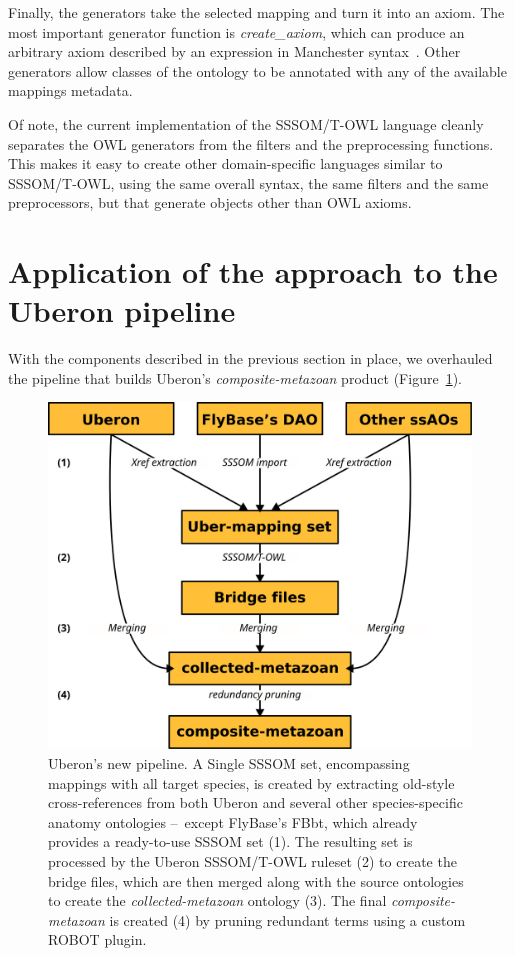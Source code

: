 \documentclass{ceurart}
\def\function#1{\textit{#1}}
\begin{document}
Finally, the generators take the selected mapping and turn it into an
axiom.  The most important generator function is
\function{create\_axiom}, which can produce an arbitrary axiom described
by an expression in Manchester syntax~\cite{patel-schneider2012}. Other
generators allow classes of the ontology to be annotated with any of the
available mappings metadata.

Of note, the current implementation of the SSSOM/T-OWL language cleanly
separates the OWL generators from the filters and the preprocessing
functions.  This makes it easy to create other domain-specific languages
similar to SSSOM/T-OWL, using the same overall syntax, the same filters
and the same preprocessors, but that generate objects other than OWL
axioms.

\section{Application of the approach to the Uberon pipeline}

With the components described in the previous section in place, we
overhauled the pipeline that builds Uberon's \emph{composite-metazoan}
product (Figure~\ref{fig:pipeline}).

\begin{figure}
  \centering
  \includegraphics[width=.4\linewidth]{pipeline}
  \caption{Uberon's new pipeline. A Single SSSOM set, encompassing
  mappings with all target species, is created by extracting
  old-style cross-references from both Uberon and several other
  species-specific anatomy ontologies --~except FlyBase's FBbt, which
  already provides a ready-to-use SSSOM set (1). The resulting set is
  processed by the Uberon SSSOM/T-OWL ruleset (2) to create the bridge
  files, which are then merged along with the source ontologies to
  create the \emph{collected-metazoan} ontology (3). The final
  \emph{composite-metazoan} is created (4) by pruning redundant terms
  using a custom ROBOT plugin.}
  \label{fig:pipeline}
\end{figure}
\end{document}
